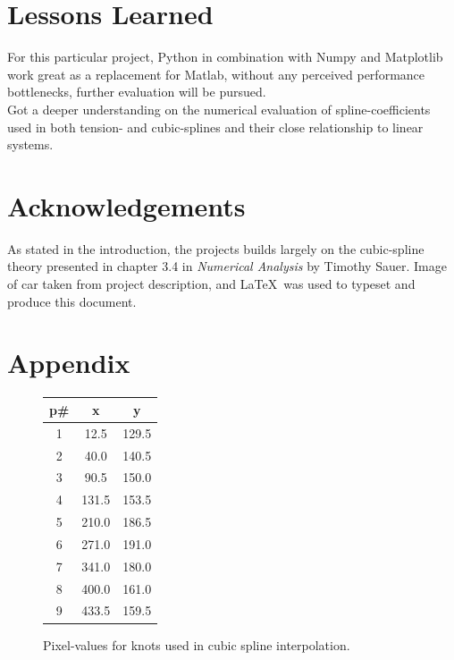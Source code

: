 \documentclass{article}
\newcommand{\T}[2]{\textbf{Task #1} -- #2:\\}
\begin{document}
\section*{Lessons Learned}

  For this particular project, Python in combination with Numpy and Matplotlib
  work great as a replacement for Matlab, without any perceived performance
  bottlenecks, further evaluation will be pursued. \\

  Got a deeper understanding on the numerical evaluation of spline-coefficients
  used in both tension- and cubic-splines and their close relationship to
  linear systems.

\section*{Acknowledgements}

  As stated in the introduction, the projects builds largely on the
  cubic-spline theory presented in chapter 3.4 in \textit{Numerical Analysis}
  by Timothy Sauer. Image of car taken from project description, and \LaTeX \ was
  used to typeset and produce this document. \\


%

\section*{Appendix}

\begin{figure}[!h]
  \center
  \begin{tabular}{| c | c | c |}
    \hline
    p\# & x & y \\
    \hline
    1 & 12.5 & 129.5 \\
    2 & 40.0 & 140.5 \\
    3 & 90.5 & 150.0 \\
    4 & 131.5 & 153.5 \\
    5 & 210.0 & 186.5 \\
    6 & 271.0 & 191.0 \\
    7 & 341.0 & 180.0 \\
    8 & 400.0 & 161.0 \\
    9 & 433.5 & 159.5 \\
    \hline
  \end{tabular}
  \caption{Pixel-values for knots used in cubic spline interpolation.}
\end{figure}
\end{document}
